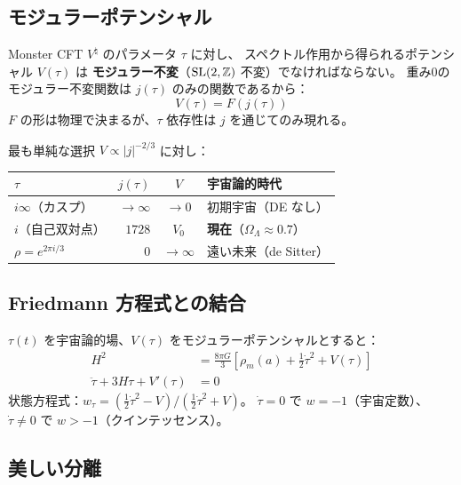 \subsection{モジュラーポテンシャル}

Monster CFT $V^\natural$ のパラメータ $\tau$ に対し、
スペクトル作用から得られるポテンシャル $V(\tau)$ は
\textbf{モジュラー不変}（$\mathrm{SL}(2,\mathbb{Z})$ 不変）でなければならない。
重み0のモジュラー不変関数は $j(\tau)$ のみの関数であるから：
\begin{equation}
  V(\tau) = F\!\left(j(\tau)\right)
  \label{eq:modpot}
\end{equation}
$F$ の形は物理で決まるが、$\tau$ 依存性は $j$ を通じてのみ現れる。

最も単純な選択 $V \propto |j|^{-2/3}$ に対し：

\begin{center}
\begin{tabular}{lrcl}
\toprule
$\tau$ & $j(\tau)$ & $V$ & 宇宙論的時代 \\
\midrule
$i\infty$（カスプ） & $\to \infty$ & $\to 0$ & 初期宇宙（DE なし） \\
$i$（自己双対点） & $1728$ & $V_0$ & \textbf{現在}（$\Omega_\Lambda \approx 0.7$） \\
$\rho = e^{2\pi i/3}$ & $0$ & $\to \infty$ & 遠い未来（de Sitter） \\
\bottomrule
\end{tabular}
\end{center}

\subsection{Friedmann 方程式との結合}

\begin{keyresult}
$\tau(t)$ を宇宙論的場、$V(\tau)$ をモジュラーポテンシャルとすると：
\begin{align}
  H^2 &= \frac{8\pi G}{3}\left[\rho_m(a) + \frac{1}{2}\dot\tau^2 + V(\tau)\right] \\
  \ddot\tau + 3H\dot\tau + V'(\tau) &= 0
  \label{eq:modfried}
\end{align}
状態方程式：$w_\tau = (\frac{1}{2}\dot\tau^2 - V) / (\frac{1}{2}\dot\tau^2 + V)$。
$\dot\tau = 0$ で $w = -1$（宇宙定数）、$\dot\tau \neq 0$ で $w > -1$（クインテッセンス）。
\end{keyresult}

\subsection{美しい分離}

